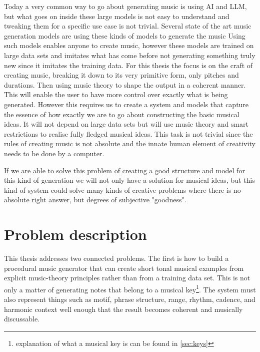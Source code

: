 Today a very common way to go about generating music is using \ac{AI} and \ac{LLM}, but what goes on inside these large models is not easy to understand and tweaking them for a specific use case is not trivial.
Several state of the art music generation models are using these kinds of models to generate the music \cite{180904281MusicTransformer, hawthorneEnablingFactorizedPiano2019, ooreThisTimeFeeling2020, dhariwalJukeboxGenerativeModel2020, baiSeedMusicUnifiedFramework2024, ferreiraLearningGenerateMusic2021}
Using such models enables anyone to create music, however these models are trained on large data sets and imitates what has come before not generating something truly new since it imitates the training data.
For this thesis the focus is on the craft of creating music, breaking it down to its very primitive form, only pitches and durations. Then using music theory to shape the output in a coherent manner.
This will enable the user to have more control over exactly what is being generated.
However this requires us to create a system and models that capture the essence of how exactly we are to go about constructing the basic musical ideas. 
It will not depend on large data sets but will use music theory and smart restrictions to realise fully fledged musical ideas. 
This task is not trivial since the rules of creating music is not absolute and the innate human element of creativity needs to be done by a computer.

If we are able to solve this problem of creating a good structure and model for this kind of generation we will not only have a solution for musical ideas, but this kind of system could solve many kinds of creative problems where there is no absolute right answer, but degrees of subjective "goodness".
\\

\section{Problem description}
This thesis addresses two connected problems. The first is how to build a procedural music generator that can create short tonal musical examples from explicit music-theory principles rather than from a training data set. This is not only a matter of generating notes that belong to a musical key\footnote{explanation of what a musical key is can be found in \ref{sec:keys}}. The system must also represent things such as motif, phrase structure, range, rhythm, cadence, and harmonic context well enough that the result becomes coherent and musically discussable.

